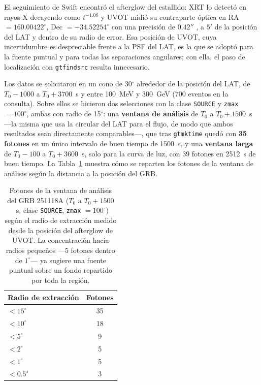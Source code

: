 El seguimiento de Swift encontró el afterglow del estallido: XRT lo detectó en rayos X decayendo como
$t^{-1.08}$ \cite{GCN42782} y UVOT midió su contraparte óptica en RA $=160.00422^{\circ}$,
Dec $=-34.52254^{\circ}$ con una precisión de $0.42''$ \cite{GCN42786}, a $5'$ de la posición del LAT y
dentro de su radio de error. Esa posición de UVOT, cuya incertidumbre es despreciable frente a la PSF
del LAT, es la que se adoptó para la fuente puntual y para todas las separaciones angulares; con ella,
el paso de localización con \texttt{gtfindsrc} resulta innecesario.

Los datos se solicitaron en un cono de 30$^{\circ}$ alrededor de la posición del LAT, de $T_0-1000$ a
$T_0+3700$~s y entre 100~MeV y 300~GeV (700 eventos en la consulta). Sobre ellos se hicieron dos
selecciones con la clase \texttt{SOURCE} y \texttt{zmax} $=100^{\circ}$, ambas con radio de
15$^{\circ}$: una \textbf{ventana de análisis} de $T_0$ a $T_0+1500$~s —la misma que usa la circular del
LAT para el flujo, de modo que ambos resultados sean directamente comparables—, que tras
\texttt{gtmktime} quedó con \textbf{35 fotones} en un único intervalo de buen tiempo de 1500~s, y una
\textbf{ventana larga} de $T_0-100$ a $T_0+3600$~s, solo para la curva de luz, con 39 fotones en 2512~s
de buen tiempo. La Tabla~\ref{tab:radios251118A} muestra cómo se reparten los fotones de la ventana de
análisis según la distancia a la posición del GRB.

\begin{table}[h!]
\centering
\caption{Fotones de la ventana de análisis del GRB 251118A ($T_0$ a $T_0+1500$~s, clase \texttt{SOURCE},
\texttt{zmax} $=100^{\circ}$) según el radio de extracción medido desde la posición del afterglow de
UVOT. La concentración hacia radios pequeños —5 fotones dentro de $1^{\circ}$— ya sugiere una fuente
puntual sobre un fondo repartido por toda la región.}
\label{tab:radios251118A}
\begin{tabular}{lc}
\toprule
\textbf{Radio de extracción} & \textbf{Fotones} \\
\midrule
$< 15^{\circ}$ & 35 \\
$< 10^{\circ}$ & 18 \\
$< 5^{\circ}$  & 9 \\
$< 2^{\circ}$  & 5 \\
$< 1^{\circ}$  & 5 \\
$< 0.5^{\circ}$ & 3 \\
\bottomrule
\end{tabular}
\end{table}

